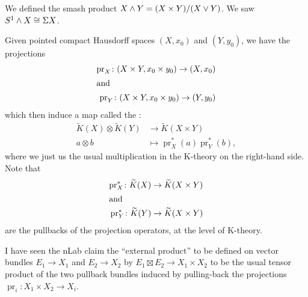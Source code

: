 
\lecture{}

\begin{recall}
We defined the smash product $X\mathbin{\wedge} Y=(X\times Y)/(X\mathbin{\vee} Y)$.
We saw $S^{1}\mathbin{\wedge} X\cong\Sigma X$.
\end{recall}

\begin{definition}
Given pointed compact Hausdorff spaces $(X,x_{0})$ and $(Y,y_{0})$, we
have the projections
\begin{subequations}
  \begin{align}
\operatorname{pr}_{X}\colon (X\times Y,x_{0}\times y_{0})\to(X,x_{0})\\
\intertext{and}
\operatorname{pr}_{Y}\colon (X\times Y,x_{0}\times y_{0})\to(Y,y_{0})
  \end{align}
\end{subequations}
which then induce a map called the :
\begin{equation}
\begin{split}
\widetilde{K}(X)\otimes\widetilde{K}(Y)&\to\widetilde{K}(X\times Y)\\
a\otimes b&\mapsto\operatorname{pr}^{*}_{X}(a)\operatorname{pr}^{*}_{Y}(b),
\end{split}
\end{equation}
where we just us the usual multiplication in the K-theory on the
right-hand side. Note that
\begin{subequations}
  \begin{align}
\operatorname{pr}^{*}_{X}\colon\widetilde{K}(X)\to\widetilde{K}(X\times Y)\\
\intertext{and}
\operatorname{pr}^{*}_{Y}\colon\widetilde{K}(Y)\to\widetilde{K}(X\times Y)
  \end{align}
\end{subequations}
are the pullbacks of the projection operators, at the level of K-theory.
\end{definition}

\begin{remark}
I have seen the nLab claim the ``external product'' to be defined on
vector bundles $E_{1}\to X_{1}$ and $E_{2}\to X_{2}$ by
$E_{1}\boxtimes E_{2}\to X_{1}\times X_{2}$ to be the usual tensor
product of the two pullback bundles induced by pulling-back the projections
$\operatorname{pr}_{i}\colon X_{1}\times X_{2}\to X_{i}$.
\end{remark}

